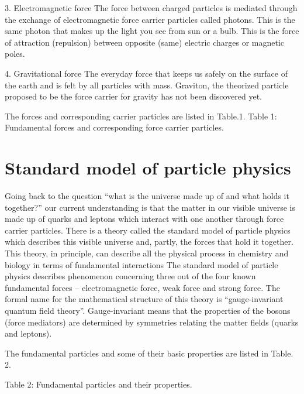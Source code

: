 3.	Electromagnetic force
The force between charged particles is mediated through the exchange of electromagnetic force carrier particles called photons.  This is the same photon that makes up the light you see from sun or a bulb. This is the force of attraction (repulsion) between opposite (same) electric charges or magnetic poles. 

4.	Gravitational force
The everyday force that keeps us safely on the surface of the earth and is felt by all particles with mass. Graviton, the theorized particle proposed to be the force carrier for gravity has not been discovered yet. 

The forces and corresponding carrier particles are listed in Table.1.
Table 1: Fundamental forces and corresponding force carrier particles.

\section{Standard model of particle physics}
Going back to the question “what is the universe made up of and what holds it together?” our current understanding is that the matter in our visible universe is made up of quarks and leptons which interact with one another through force carrier particles.  There is a theory called the standard model of particle physics which describes this visible universe and, partly, the forces that hold it together. This theory, in principle, can describe all the physical process in chemistry and biology in terms of fundamental interactions The standard model of particle physics describes phenomenon concerning three out of the four known fundamental forces – electromagnetic force, weak force and strong force. The formal name for the mathematical structure of this theory is “gauge-invariant quantum field theory”.  Gauge-invariant means that the properties of the bosons (force mediators) are determined by symmetries relating the matter fields (quarks and leptons). 

The fundamental particles and some of their basic properties are listed in Table. 2.














Table 2: Fundamental particles and their properties.

